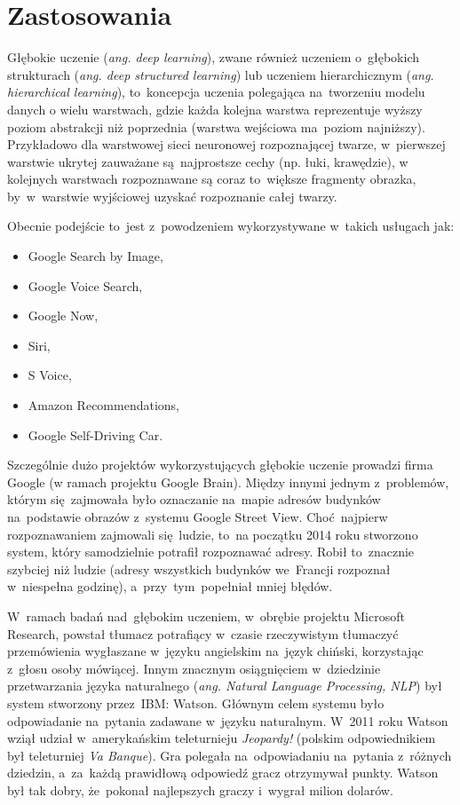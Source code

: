 \section{Zastosowania}
Głębokie uczenie (\textit{ang. deep learning}), zwane również uczeniem
o~głębokich strukturach (\textit{ang. deep structured learning}) lub uczeniem
hierarchicznym (\textit{ang. hierarchical learning}), to~koncepcja uczenia
polegająca na~tworzeniu modelu danych o wielu warstwach, gdzie każda kolejna
warstwa reprezentuje wyższy poziom abstrakcji niż poprzednia (warstwa wejściowa
ma~poziom najniższy). Przykładowo dla warstwowej sieci neuronowej rozpoznającej
twarze, w~pierwszej warstwie ukrytej zauważane są~najprostsze cechy (np. łuki,
krawędzie), w kolejnych warstwach rozpoznawane są coraz to~większe fragmenty
obrazka, by~w~warstwie wyjściowej uzyskać rozpoznanie całej twarzy.

Obecnie podejście to~jest z~powodzeniem wykorzystywane w~takich usługach jak:
\begin{itemize}
  \item Google Search by Image,
  \item Google Voice Search,
  \item Google Now,
  \item Siri,
  \item S Voice,
  \item Amazon Recommendations,
  \item Google Self-Driving Car.
\end{itemize}

Szczególnie dużo projektów wykorzystujących głębokie uczenie prowadzi firma
Google (w ramach projektu Google Brain). Między innymi jednym z~problemów,
którym się~zajmowała było oznaczanie na~mapie adresów budynków na~podstawie
obrazów z~systemu Google Street View. Choć~najpierw rozpoznawaniem zajmowali
się~ludzie, to~na początku 2014 roku stworzono system, który
samodzielnie potrafił rozpoznawać adresy. Robił to~znacznie szybciej niż ludzie
(adresy wszystkich budynków we~Francji rozpoznał w~niespełna godzinę),
a~przy~tym~popełniał mniej błędów.

W~ramach badań nad~głębokim uczeniem, w~obrębie projektu Microsoft Research,
powstał tłumacz potrafiący w~czasie rzeczywistym tłumaczyć przemówienia
wygłaszane w~języku angielskim na~język chiński, korzystając z~głosu
osoby mówiącej. Innym znacznym osiągnięciem w~dziedzinie przetwarzania języka naturalnego (\textit{ang.
Natural Language Processing, NLP}) był system stworzony przez~IBM: Watson.
Głównym celem systemu było odpowiadanie na~pytania zadawane w~języku naturalnym.
W~2011 roku Watson wziął udział w~amerykańskim teleturnieju \textit{Jeopardy!} (polskim odpowiednikiem był
teleturniej \textit{Va Banque}). Gra polegała na~odpowiadaniu na~pytania z~różnych dziedzin, a~za~każdą
prawidłową odpowiedź gracz otrzymywał punkty. Watson był tak dobry, że~pokonał najlepszych graczy i~wygrał
milion dolarów.

